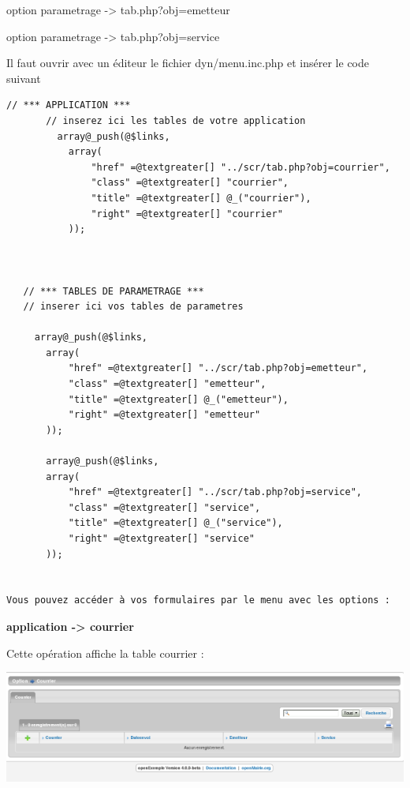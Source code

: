 \documentclass[letterpaper,10pt,french]{manual}
\begin{document}
option parametrage -\textgreater{} tab.php?obj=emetteur

option parametrage -\textgreater{} tab.php?obj=service

Il faut ouvrir avec un éditeur le fichier dyn/menu.inc.php et insérer le code suivant

\begin{Verbatim}[commandchars=@\[\]]
       // *** APPLICATION ***
       // inserez ici les tables de votre application
         array@_push(@$links,
           array(
               "href" =@textgreater[] "../scr/tab.php?obj=courrier",
               "class" =@textgreater[] "courrier",
               "title" =@textgreater[] @_("courrier"),
               "right" =@textgreater[] "courrier"
           ));



   // *** TABLES DE PARAMETRAGE ***
   // inserer ici vos tables de parametres

     array@_push(@$links,
       array(
           "href" =@textgreater[] "../scr/tab.php?obj=emetteur",
           "class" =@textgreater[] "emetteur",
           "title" =@textgreater[] @_("emetteur"),
           "right" =@textgreater[] "emetteur"
       ));

       array@_push(@$links,
       array(
           "href" =@textgreater[] "../scr/tab.php?obj=service",
           "class" =@textgreater[] "service",
           "title" =@textgreater[] @_("service"),
           "right" =@textgreater[] "service"
       ));


Vous pouvez accéder à vos formulaires par le menu avec les options :
\end{Verbatim}

\textbf{application -\textgreater{} courrier}

Cette opération affiche la table courrier :

\includegraphics{utilisation_3.png}
\end{document}

